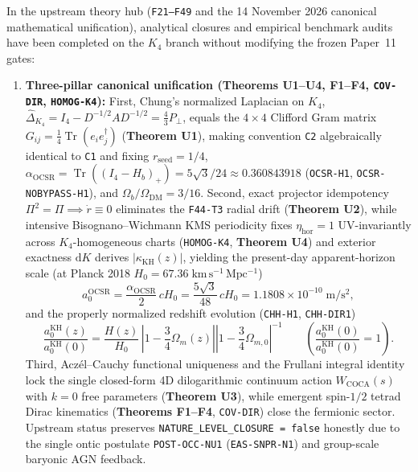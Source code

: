 \documentclass[11pt]{article}
\begin{document}
In the upstream theory hub (\texttt{F21--F49} and the 14 November 2026 canonical mathematical unification), analytical closures and empirical benchmark audits have been completed on the $K_4$ branch without modifying the frozen Paper~11 gates:
\begin{enumerate}[leftmargin=1.8em]
\item \textbf{Three-pillar canonical unification (\textbf{Theorems U1--U4}, \textbf{F1--F4}, \texttt{COV-DIR}, \texttt{HOMOG-K4}):}
First, Chung's normalized Laplacian on $K_4$, $\widehat{\Delta}_{K_4}=I_4-D^{-1/2}AD^{-1/2}=\frac{4}{3}P_\perp$, equals the $4\times 4$ Clifford Gram matrix $G_{ij}=\frac{1}{4}\operatorname{Tr}(e_i e_j^\dagger)$ (\textbf{Theorem U1}), making convention \texttt{C2} algebraically identical to \texttt{C1} and fixing $r_{\mathrm{seed}}=1/4$, $\alpha_{\mathrm{OCSR}}=\operatorname{Tr}((I_4-H_b)_+)=5\sqrt{3}/24\approx 0.360843918$ (\texttt{OCSR-H1}, \texttt{OCSR-NOBYPASS-H1}), and $\Omega_b/\Omega_{\mathrm{DM}}=3/16$.
Second, exact projector idempotency $\Pi^2=\Pi\implies\dot{r}\equiv 0$ eliminates the \texttt{F44-T3} radial drift (\textbf{Theorem U2}), while intensive Bisognano--Wichmann KMS periodicity fixes $\eta_{\mathrm{hor}}=1$ UV-invariantly across $K_4$-homogeneous charts (\texttt{HOMOG-K4}, \textbf{Theorem U4}) and exterior exactness $\mathrm{d}K$ derives $|\kappa_{\mathrm{KH}}(z)|$, yielding the present-day apparent-horizon scale (at Planck 2018 $H_0=67.36\;\mathrm{km\,s^{-1}\,Mpc^{-1}}$)
\[
a_0^{\mathrm{OCSR}} = \frac{\alpha_{\mathrm{OCSR}}}{2}\,cH_0 = \frac{5\sqrt{3}}{48}\,cH_0 = 1.1808\times 10^{-10}\;\mathrm{m/s^2},
\]
and the properly normalized redshift evolution (\texttt{CHH-H1}, \texttt{CHH-DIR1})
\[
\frac{a_0^{\mathrm{KH}}(z)}{a_0^{\mathrm{KH}}(0)}
= \frac{H(z)}{H_0}\,\left|1-\frac{3}{4}\Omega_m(z)\right|\left|1-\frac{3}{4}\Omega_{m,0}\right|^{-1}
\qquad \left(\frac{a_0^{\mathrm{KH}}(0)}{a_0^{\mathrm{KH}}(0)}=1\right).
\]
Third, Acz\'el--Cauchy functional uniqueness and the Frullani integral identity lock the single closed-form 4D dilogarithmic continuum action $W_{\mathrm{COCA}}(s)$ with $k=0$ free parameters (\textbf{Theorem U3}), while emergent spin-$1/2$ tetrad Dirac kinematics (\textbf{Theorems F1--F4}, \texttt{COV-DIR}) close the fermionic sector. Upstream status preserves \texttt{NATURE\_LEVEL\_CLOSURE = false} honestly due to the single ontic postulate \texttt{POST-OCC-NU1} (\texttt{EAS-SNPR-N1}) and group-scale baryonic AGN feedback.


\end{enumerate}
\end{document}

